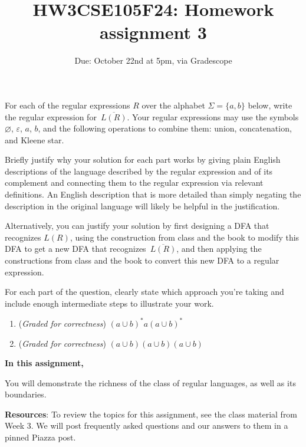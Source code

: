 \documentclass[12pt, oneside]{article}
\newcommand{\gradeCorrect}{({\it Graded for correctness}) }
\begin{document}
\begin{enumerate}[wide, labelwidth=!, labelindent=0pt]
For each of the regular expressions $R$ over the alphabet $\Sigma = \{a,b\}$ below, write the regular 
expression for~$\overline{L(R)}$. Your regular expressions may use the symbols
$\varnothing$, $\varepsilon$, $a$, $b$, and the 
following operations to combine them: union, concatenation, 
and Kleene star.

Briefly justify why your solution for each part works by giving plain English descriptions of the language 
described by the regular expression and of its complement and connecting them to the regular 
expression via relevant definitions. An English description that is more 
detailed than simply negating the description in the original language will likely be helpful in the justification.

Alternatively, you can justify your solution by first designing a DFA that recognizes $L(R)$, 
using the construction from class and the book to modify this DFA to get a new DFA that recognizes~$\overline{L(R)}$, 
and then applying the constructions from class and the book to convert this new DFA to a regular expression.

For each part of the question, clearly state which approach you're taking and include enough intermediate
steps to illustrate your work.


\begin{enumerate}
    \item\gradeCorrect $(a \cup b)^*a(a \cup b)^*$
    \item\gradeCorrect $(a \cup b) (a \cup b) (a \cup b)$
\end{enumerate}

\end{enumerate}
\newpage

\title{HW3CSE105F24: Homework assignment 3}
\date{Due: October 22nd at 5pm, via Gradescope}



\maketitle
\thispagestyle{fancy}

{\bf In this assignment,}

You will demonstrate the richness of the class of regular languages, as well as its boundaries.


{\bf Resources}: To review the topics 
for this assignment, see the class material from Week 3.
We will post frequently asked questions and our answers to them in a 
pinned Piazza post. 
\end{document}
